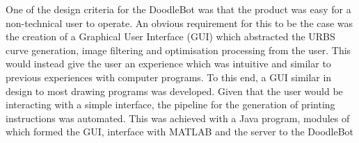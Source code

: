 One of the design criteria for the DoodleBot was that the product was easy for a non-technical user to operate. An obvious requirement for this to be the case was the creation of a Graphical User Interface (GUI) which abstracted the URBS curve generation, image filtering and optimisation processing from the user. This would instead give the user an experience which was intuitive and similar to previous experiences with computer programs. To this end, a GUI similar in design to most drawing programs was developed.
Given that the user would be interacting with a simple interface, the pipeline for the generation of printing instructions was automated. This was achieved with a Java program, modules of which formed the GUI, interface with MATLAB\textsuperscript{\textregistered} and the server to the DoodleBot
